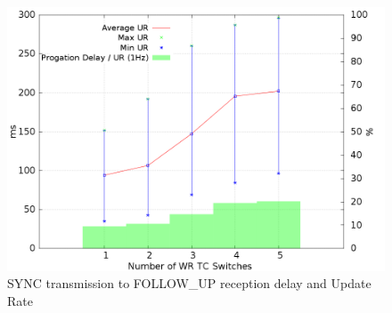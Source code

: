 \begin{figure}[!t]
\centering
\includegraphics[scale=0.27]{fig/update_rate.png}
\caption{SYNC transmission to FOLLOW\_UP reception delay and Update Rate}
\label{fig:update_rate}
\end{figure}
